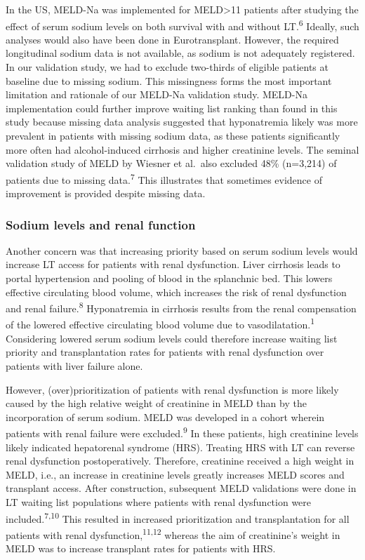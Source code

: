 \documentclass[11pt,english,]{book} %
\begin{document}
In the US, MELD-Na was implemented for MELD\textgreater11 patients after studying the effect of serum sodium levels on both survival with and without LT.\textsuperscript{6} Ideally, such analyses would also have been done in Eurotransplant. However, the required longitudinal sodium data is not available, as sodium is not adequately registered. In our validation study, we had to exclude two-thirds of eligible patients at baseline due to missing sodium. This missingness forms the most important limitation and rationale of our MELD-Na validation study. MELD-Na implementation could further improve waiting list ranking than found in this study because missing data analysis suggested that hyponatremia likely was more prevalent in patients with missing sodium data, as these patients significantly more often had alcohol-induced cirrhosis and higher creatinine levels. The seminal validation study of MELD by Wiesner et al.~also excluded 48\% (n=3,214) of patients due to missing data.\textsuperscript{7} This illustrates that sometimes evidence of improvement is provided despite missing data.

\hypertarget{sodium-levels-and-renal-function}{%
\subsubsection*{Sodium levels and renal function}\label{sodium-levels-and-renal-function}}

Another concern was that increasing priority based on serum sodium levels would increase LT access for patients with renal dysfunction. Liver cirrhosis leads to portal hypertension and pooling of blood in the splanchnic bed. This lowers effective circulating blood volume, which increases the risk of renal dysfunction and renal failure.\textsuperscript{8} Hyponatremia in cirrhosis results from the renal compensation of the lowered effective circulating blood volume due to vasodilatation.\textsuperscript{1} Considering lowered serum sodium levels could therefore increase waiting list priority and transplantation rates for patients with renal dysfunction over patients with liver failure alone.

However, (over)prioritization of patients with renal dysfunction is more likely caused by the high relative weight of creatinine in MELD than by the incorporation of serum sodium. MELD was developed in a cohort wherein patients with renal failure were excluded.\textsuperscript{9} In these patients, high creatinine levels likely indicated hepatorenal syndrome (HRS). Treating HRS with LT can reverse renal dysfunction postoperatively. Therefore, creatinine received a high weight in MELD, i.e., an increase in creatinine levels greatly increases MELD scores and transplant access. After construction, subsequent MELD validations were done in LT waiting list populations where patients with renal dysfunction were included.\textsuperscript{7,10} This resulted in increased prioritization and transplantation for all patients with renal dysfunction,\textsuperscript{11,12} whereas the aim of creatinine's weight in MELD was to increase transplant rates for patients with HRS.
\end{document}
